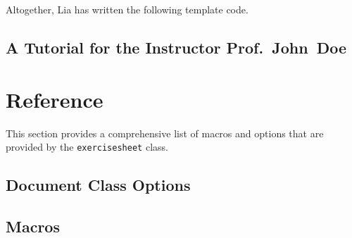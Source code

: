 \documentclass{report}
\def\exercisesheet{\texttt{exercisesheet}}
\begin{document}
Altogether, Lia has written the following template code.




\section{A Tutorial for the Instructor Prof.~John~Doe}

\chapter{Reference}

This section provides a comprehensive list of macros and options that
are provided by the \exercisesheet{} class.

\section{Document Class Options}

\section{Macros}
\end{document}
